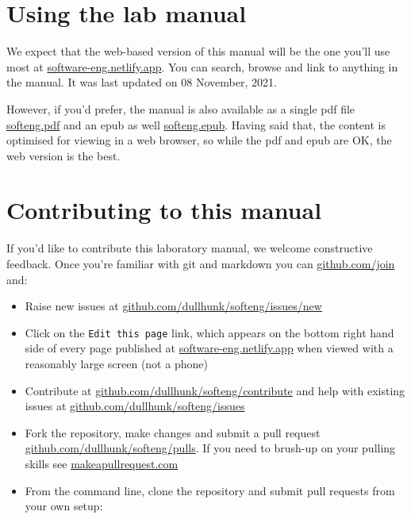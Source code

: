\documentclass[
]{book}
\providecommand{\tightlist}{%
  \setlength{\itemsep}{0pt}\setlength{\parskip}{0pt}}
\begin{document}
\hypertarget{usingit}{%
\section{Using the lab manual}\label{usingit}}

We expect that the web-based version of this manual will be the one you'll use most at \href{https://software-eng.netlify.app/}{software-eng.netlify.app}. You can search, browse and link to anything in the manual. It was last updated on 08 November, 2021.

However, if you'd prefer, the manual is also available as a single pdf file \href{https://software-eng.netlify.app/softeng.pdf}{softeng.pdf} and an epub as well \href{https://software-eng.netlify.app/softeng.epub}{softeng.epub}. Having said that, the content is optimised for viewing in a web browser, so while the pdf and epub are OK, the web version is the best.

\hypertarget{contributing}{%
\section{Contributing to this manual}\label{contributing}}

If you'd like to contribute this laboratory manual, we welcome constructive feedback. Once you're familiar with git and markdown you can \href{https://github.com/join}{github.com/join} and:

\begin{itemize}
\tightlist
\item
  Raise new issues at \href{https://github.com/dullhunk/softeng/issues/new}{github.com/dullhunk/softeng/issues/new}
\item
  Click on the \texttt{Edit\ this\ page} link, which appears on the bottom right hand side of every page published at \href{https://software-eng.netlify.app}{software-eng.netlify.app} when viewed with a reasonably large screen (not a phone)
\item
  Contribute at \href{https://github.com/dullhunk/softeng/contribute}{github.com/dullhunk/softeng/contribute} and help with existing issues at \href{https://github.com/dullhunk/softeng/issues}{github.com/dullhunk/softeng/issues}
\item
  Fork the repository, make changes and submit a pull request \href{https://github.com/dullhunk/softeng/pulls}{github.com/dullhunk/softeng/pulls}. If you need to brush-up on your pulling skills see \href{http://makeapullrequest.com/}{makeapullrequest.com}
\item
  From the command line, clone the repository and submit pull requests from your own setup:
\end{itemize}
\end{document}
